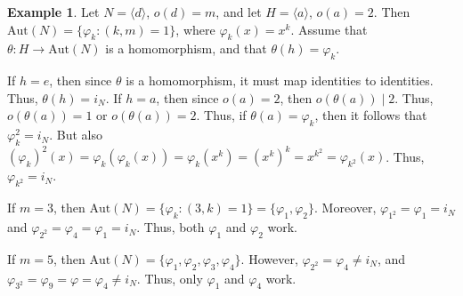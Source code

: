 \documentclass{article}
\theoremstyle{definition}
\theoremstyle{remark}
\theoremstyle{definition}
\newtheorem{example}{Example}[section]
\begin{document}
    \begin{example}
        Let $N=\langle d\rangle$, $o(d)=m$, and let $H=\langle a\rangle$, $o(a)=2$. Then $\text{Aut}(N)=\{\varphi_k\colon (k,m)=1\}$, where $\varphi_k(x)=x^k$. Assume that $\theta\colon H\rightarrow\text{Aut}(N)$ is a homomorphism, and that $\theta(h)=\varphi_k$.\par If $h=e$, then since $\theta$ is a homomorphism, it must map identities to identities. Thus, $\theta(h)=i_N$. If $h=a$, then since $o(a)=2$, then $o(\theta(a))\mid 2$. Thus, $o(\theta(a))=1$ or $o(\theta(a))=2$. Thus, if $\theta(a)=\varphi_k$, then it follows that $\varphi_k^2=i_N$. But also $(\varphi_k)^2(x)=\varphi_k(\varphi_k(x))=\varphi_k(x^k)=(x^k)^k=x^{k^2}=\varphi_{k^2}(x)$. Thus, $\varphi_{k^{2}}=i_N$.\par If $m=3$, then $\text{Aut}(N)=\{\varphi_k\colon (3,k)=1\}=\{\varphi_1,\varphi_2\}$. Moreover, $\varphi_{1^2}=\varphi_1=i_N$ and $\varphi_{2^2}=\varphi_4=\varphi_1=i_N$. Thus, both $\varphi_1$ and $\varphi_2$ work.\par If $m=5$, then $\text{Aut}(N)=\{\varphi_1,\varphi_2,\varphi_3,\varphi_4\}$. However, $\varphi_{2^2}=\varphi_4\neq i_N$, and $\varphi_{3^2}=\varphi_9=\varphi=\varphi_4\neq i_N$. Thus, only $\varphi_1$ and $\varphi_4$ work.
    \end{example}
    
\end{document}
